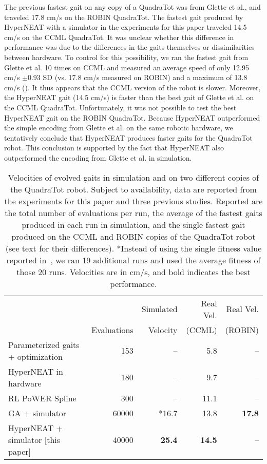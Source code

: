The previous fastest gait on any copy of a QuadraTot was from Glette
et al., and traveled 17.8 cm/s on the ROBIN QuadraTot. The
fastest gait produced by HyperNEAT with a simulator in the experiments for this paper traveled 14.5
cm/s on the CCML QuadraTot. It was unclear whether this difference in performance was due to
the differences in the gaits themselves or dissimilarities between
hardware. To control for this possibility, we ran the fastest gait
from Glette et al. 10 times on CCML and measured an average speed of
only 12.95 cm/s $\pm0.93$ SD (vs. 17.8 cm/s measured on ROBIN) and a maximum of
13.8 cm/s (). It thus appears that the CCML version of the robot is slower. Moreover, the HyperNEAT gait (14.5 cm/s) is faster than the best gait of Glette et al. on the CCML QuadraTot. Unfortunately, it was not possible to test the best HyperNEAT gait on the ROBIN QuadraTot. Because HyperNEAT outperformed the simple encoding from Glette et al. on the same robotic hardware, we tentatively
conclude that HyperNEAT produces faster gaits for the QuadraTot robot. This conclusion is supported by the fact that HyperNEAT also outperformed the encoding from Glette et al. in simulation. 

\begin{table}
\begin{center}
\begin{tabular}{|l|r|r|r|r|}
\hline
                                         &              & Simulated  & Real Vel. & Real Vel.  \\
                                         & Evaluations  & Velocity &    (CCML)     & (ROBIN) \\
\hline
Parameterized gaits + optimization \cite{yos:clune}   &153    & --    & 5.8 & --\\
\hline
HyperNEAT in hardware \cite{yos:clune}                 & 180         & --         &   9.7  & --   \\
\hline
RL PoWER Spline \cite{haocheng}                         & 300         & --         &   11.1 & --\\
\hline
GA + simulator \cite{glette}             & 60000       & *16.7       &   13.8   & \textbf{17.8}  \\
\hline
HyperNEAT + simulator [this paper]                     & 40000       & \textbf{25.4}       &   \textbf{14.5} & --\\
\hline
\end{tabular}
\vspace{.35cm}
\caption{Velocities of evolved gaits in simulation and on two different copies of the QuadraTot robot. Subject to availability, data are reported from the experiments for this paper and three previous studies. Reported are the total number of evaluations per run, the average of the fastest gaits produced in each run in simulation, and the single fastest gait produced on the CCML and ROBIN copies of the QuadraTot robot (see text for their differences). *Instead of using the single fitness value reported in~\cite{glette}, we ran 19 additional runs and used the average fitness of those 20 runs. Velocities are in cm/s, and bold indicates the best performance. }  
\end{center}
\end{table}

